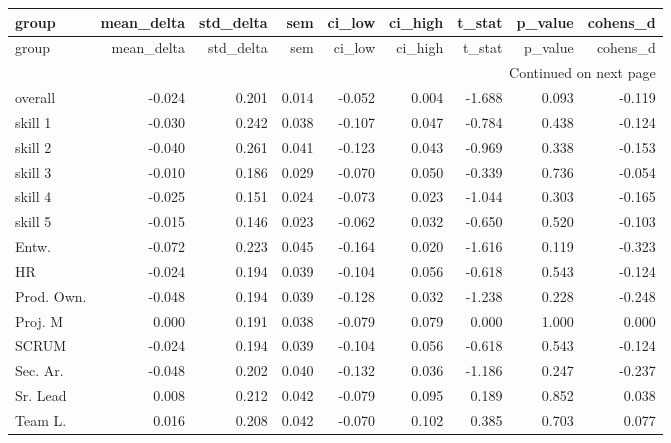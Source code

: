 \begin{longtable}{lrrrrrrrr}
\toprule
group & mean\_delta & std\_delta & sem & ci\_low & ci\_high & t\_stat & p\_value & cohens\_d \\
\midrule
\endfirsthead
\toprule
group & mean\_delta & std\_delta & sem & ci\_low & ci\_high & t\_stat & p\_value & cohens\_d \\
\midrule
\endhead
\midrule
\multicolumn{9}{r}{Continued on next page} \\
\midrule
\endfoot
\bottomrule
\endlastfoot
overall & -0.024 & 0.201 & 0.014 & -0.052 & 0.004 & -1.688 & 0.093 & -0.119 \\
skill 1 & -0.030 & 0.242 & 0.038 & -0.107 & 0.047 & -0.784 & 0.438 & -0.124 \\
skill 2 & -0.040 & 0.261 & 0.041 & -0.123 & 0.043 & -0.969 & 0.338 & -0.153 \\
skill 3 & -0.010 & 0.186 & 0.029 & -0.070 & 0.050 & -0.339 & 0.736 & -0.054 \\
skill 4 & -0.025 & 0.151 & 0.024 & -0.073 & 0.023 & -1.044 & 0.303 & -0.165 \\
skill 5 & -0.015 & 0.146 & 0.023 & -0.062 & 0.032 & -0.650 & 0.520 & -0.103 \\
Entw. & -0.072 & 0.223 & 0.045 & -0.164 & 0.020 & -1.616 & 0.119 & -0.323 \\
HR & -0.024 & 0.194 & 0.039 & -0.104 & 0.056 & -0.618 & 0.543 & -0.124 \\
Prod. Own. & -0.048 & 0.194 & 0.039 & -0.128 & 0.032 & -1.238 & 0.228 & -0.248 \\
Proj. M & 0.000 & 0.191 & 0.038 & -0.079 & 0.079 & 0.000 & 1.000 & 0.000 \\
SCRUM & -0.024 & 0.194 & 0.039 & -0.104 & 0.056 & -0.618 & 0.543 & -0.124 \\
Sec. Ar. & -0.048 & 0.202 & 0.040 & -0.132 & 0.036 & -1.186 & 0.247 & -0.237 \\
Sr. Lead & 0.008 & 0.212 & 0.042 & -0.079 & 0.095 & 0.189 & 0.852 & 0.038 \\
Team L. & 0.016 & 0.208 & 0.042 & -0.070 & 0.102 & 0.385 & 0.703 & 0.077 \\
\end{longtable}
